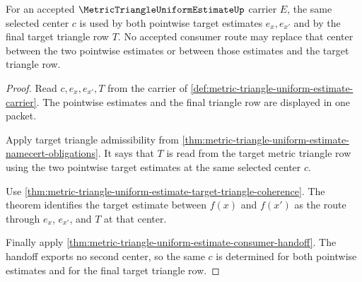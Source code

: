\begin{theorem}
\label{thm:metric-triangle-uniform-estimate-center-reuse-determinacy}
For an accepted $\MetricTriangleUniformEstimateUp$ carrier $E$, the same selected center $c$ is used by both pointwise target estimates $e_x,e_{x'}$ and by the final target triangle row $T$. No accepted consumer route may replace that center between the two pointwise estimates or between those estimates and the target triangle row.
\end{theorem}
\begin{proof}
Read $c,e_x,e_{x'},T$ from the carrier of \autoref{def:metric-triangle-uniform-estimate-carrier}. The pointwise estimates and the final triangle row are displayed in one packet.

Apply target triangle admissibility from \autoref{thm:metric-triangle-uniform-estimate-namecert-obligations}. It says that $T$ is read from the target metric triangle row using the two pointwise target estimates at the same selected center $c$.

Use \autoref{thm:metric-triangle-uniform-estimate-target-triangle-coherence}. The theorem identifies the target estimate between $f(x)$ and $f(x')$ as the route through $e_x$, $e_{x'}$, and $T$ at that center.

Finally apply \autoref{thm:metric-triangle-uniform-estimate-consumer-handoff}. The handoff exports no second center, so the same $c$ is determined for both pointwise estimates and for the final target triangle row.
\end{proof}

